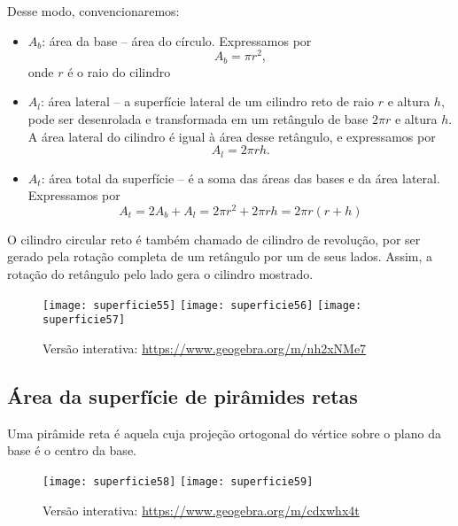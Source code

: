 Desse modo, convencionaremos:
\begin{itemize}
  \item $A_b$: área da base -- área do círculo. Expressamos por
  \begin{equation*}
  A_b=\pi r^2,
  \end{equation*}
  onde $r$ é o raio do cilindro

  \item $A_l$: área lateral -- a superfície lateral de um cilindro reto de raio $r$ e altura $h$, pode ser desenrolada e transformada em um retângulo de base $2\pi r$ e altura $h$. A área lateral do cilindro é igual à área desse retângulo, e expressamos por  
  \begin{equation*}
  A_l=2\pi rh.
  \end{equation*}
  \item $A_t$: área total da superfície -- é a soma das áreas das bases e da área lateral. Expressamos por 
  \begin{equation*}
  A_t=2A_b+A_l=2\pi r^2+2\pi rh=2\pi r(r+h)
  \end{equation*}
\end{itemize}

O cilindro circular reto é também chamado de cilindro de revolução, por ser gerado pela rotação completa de um retângulo por um de seus lados. Assim, a rotação do retângulo pelo lado gera o cilindro mostrado.

\begin{figure}[H]
\centering

\texttt{[image: superficie55]}\hspace{.5em}
\texttt{[image: superficie56]}\hspace{.5em}
\texttt{[image: superficie57]}

\caption{Versão interativa: \url{https://www.geogebra.org/m/nh2xNMe7}}
\end{figure}

\subsection{ Área da superfície de pirâmides retas}

Uma pirâmide reta é aquela cuja projeção ortogonal do vértice sobre o plano da base é o centro da base.

\begin{figure}[H]
\centering

\texttt{[image: superficie58]}\hspace{.5em}
\texttt{[image: superficie59]}

\caption{Versão interativa: \url{https://www.geogebra.org/m/cdxwhx4t}}
\end{figure}

